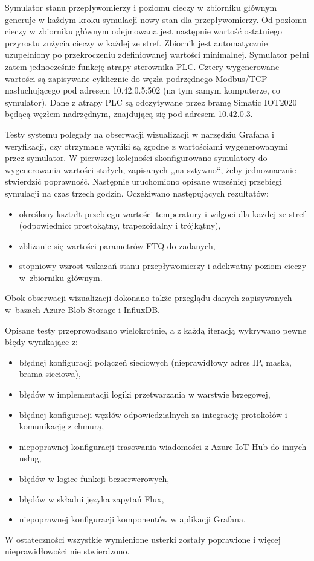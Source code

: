 \documentclass[a4paper, 12pt, twoside]{article}
\begin{document}
Symulator stanu przepływomierzy i poziomu cieczy w zbiorniku głównym generuje 
w każdym kroku symulacji nowy stan dla przepływomierzy. Od poziomu cieczy w zbiorniku głównym
odejmowana jest następnie wartość ostatniego przyrostu zużycia cieczy w każdej ze stref. 
Zbiornik jest automatycznie uzupełniony po przekroczeniu zdefiniowanej wartości minimalnej.
Symulator pełni zatem jednocześnie funkcję atrapy sterownika PLC. Cztery wygenerowane
wartości są zapisywane cyklicznie do węzła podrzędnego Modbus/TCP nasłuchującego
pod adresem 10.42.0.5:502 (na tym samym komputerze, co symulator). Dane 
z atrapy PLC są odczytywane przez bramę Simatic IOT2020 będącą węzłem nadrzędnym, 
znajdującą się pod adresem 10.42.0.3. 

Testy systemu polegały na obserwacji wizualizacji w narzędziu Grafana i weryfikacji,
czy otrzymane wyniki są zgodne z wartościami wygenerowanymi przez symulator.
W pierwszej kolejności skonfigurowano symulatory do wygenerowania wartości stałych,
zapisanych ,,na sztywno``, żeby jednoznacznie stwierdzić poprawność. Następnie 
uruchomiono opisane wcześniej przebiegi symulacji na czas trzech godzin. 
Oczekiwano następujących rezultatów:
\begin{itemize}
      \itemsep0em
      \item określony kształt przebiegu wartości temperatury i wilgoci dla każdej 
      ze stref (odpowiednio: prostokątny, trapezoidalny i trójkątny),
      \item zbliżanie się wartości parametrów FTQ do zadanych,
      \item stopniowy wzrost wskazań stanu przepływomierzy i adekwatny poziom cieczy 
      w~zbiorniku głównym. 
\end{itemize}
\noindent Obok obserwacji wizualizacji dokonano także przeglądu danych zapisywanych
w~bazach Azure Blob Storage i InfluxDB. 

Opisane testy przeprowadzano wielokrotnie, a z każdą iteracją wykrywano 
pewne błędy wynikające z:
\begin{itemize}
      \itemsep0em
      \item błędnej konfiguracji połączeń sieciowych (nieprawidłowy adres IP, maska, brama sieciowa),
      \item błędów w implementacji logiki przetwarzania w warstwie brzegowej,
      \item błędnej konfiguracji węzłów odpowiedzialnych za integrację protokołów i komunikację z chmurą,
      \item niepoprawnej konfiguracji trasowania wiadomości z Azure IoT Hub do innych usług,
      \item błędów w logice funkcji bezserwerowych, 
      \item błędów w składni języka zapytań Flux,
      \item niepoprawnej konfiguracji komponentów w aplikacji Grafana.  
\end{itemize}
\noindent W ostateczności wszystkie wymienione usterki zostały poprawione i więcej nieprawidłowości nie
stwierdzono. 
\end{document}
